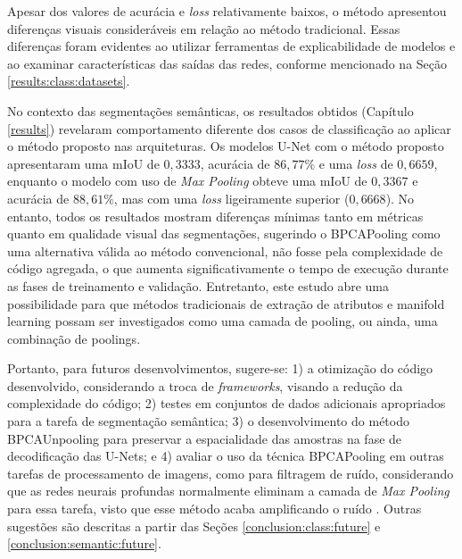 Apesar dos valores de acurácia e \textit{loss} relativamente baixos, o método apresentou diferenças visuais consideráveis em relação ao método tradicional. Essas diferenças foram evidentes ao utilizar ferramentas de explicabilidade de modelos e ao examinar características das saídas das redes, conforme mencionado na Seção \ref{results:class:datasets}.

No contexto das segmentações semânticas, os resultados obtidos (Capítulo \ref{results}) revelaram comportamento diferente dos casos de classificação ao aplicar o método proposto nas arquiteturas. Os modelos U-Net com o método proposto apresentaram uma mIoU de $0,3333$, acurácia de $86,77\%$ e uma \textit{loss} de $0,6659$, enquanto o modelo com uso de \textit{Max Pooling} obteve uma mIoU de $0,3367$ e acurácia de $88,61\%$, mas com uma \textit{loss} ligeiramente superior ($0,6668$). No entanto, todos os resultados mostram diferenças mínimas tanto em métricas quanto em qualidade visual das segmentações, sugerindo o BPCAPooling como uma alternativa válida ao método convencional, não fosse pela complexidade de código agregada, o que aumenta significativamente o tempo de execução durante as fases de treinamento e validação. Entretanto, este estudo abre uma possibilidade para que métodos tradicionais de extração de atributos e manifold learning possam ser investigados como uma camada de pooling, ou ainda, uma combinação de poolings.

Portanto, para futuros desenvolvimentos, sugere-se: 1) a otimização do código desenvolvido, considerando a troca de \textit{frameworks}, visando a redução da complexidade do código; 2) testes em conjuntos de dados adicionais apropriados para a tarefa de segmentação semântica; 3) o desenvolvimento do método BPCAUnpooling para preservar a espacialidade das amostras na fase de decodificação das U-Nets; e 4) avaliar o uso da técnica BPCAPooling em outras tarefas de processamento de imagens, como para filtragem de ruído, considerando que as redes neurais profundas normalmente eliminam a camada de \textit{Max Pooling} para essa tarefa, visto que esse método acaba amplificando o ruído \citep{zhang2017beyond}. Outras sugestões são descritas a partir das Seções \ref{conclusion:class:future} e \ref{conclusion:semantic:future}.

